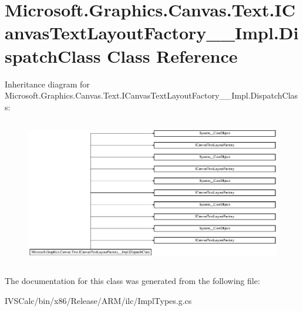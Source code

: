 \hypertarget{class_microsoft_1_1_graphics_1_1_canvas_1_1_text_1_1_i_canvas_text_layout_factory_____impl_1_1_dispatch_class}{}\section{Microsoft.\+Graphics.\+Canvas.\+Text.\+I\+Canvas\+Text\+Layout\+Factory\+\_\+\+\_\+\+Impl.\+Dispatch\+Class Class Reference}
\label{class_microsoft_1_1_graphics_1_1_canvas_1_1_text_1_1_i_canvas_text_layout_factory_____impl_1_1_dispatch_class}
Inheritance diagram for Microsoft.\+Graphics.\+Canvas.\+Text.\+I\+Canvas\+Text\+Layout\+Factory\+\_\+\+\_\+\+Impl.\+Dispatch\+Class\+:\begin{figure}[H]
\begin{center}
\leavevmode
\includegraphics[height=6.457023cm]{class_microsoft_1_1_graphics_1_1_canvas_1_1_text_1_1_i_canvas_text_layout_factory_____impl_1_1_dispatch_class}
\end{center}
\end{figure}


The documentation for this class was generated from the following file\+:\begin{DoxyCompactItemize}
\item 
I\+V\+S\+Calc/bin/x86/\+Release/\+A\+R\+M/ilc/Impl\+Types.\+g.\+cs\end{DoxyCompactItemize}
